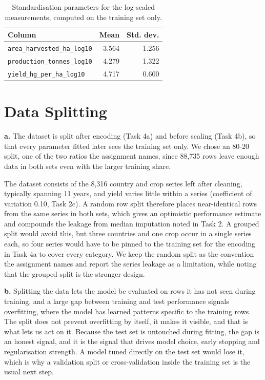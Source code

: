 \documentclass{article}
\begin{document}
\begin{table}[H]
    \centering
    \begin{tabular}{lrr}
        \toprule
        Column & Mean & Std. dev. \\
        \midrule
        \texttt{area\_harvested\_ha\_log10} & 3.564 & 1.256 \\
        \texttt{production\_tonnes\_log10} & 4.279 & 1.322 \\
        \texttt{yield\_hg\_per\_ha\_log10} & 4.717 & 0.600 \\
        \bottomrule
    \end{tabular}
    \caption{Standardisation parameters for the log-scaled measurements, computed on the training set only.}
    \label{tab:scaling}
\end{table}

\section{Data Splitting}

\textbf{a.}
The dataset is split after encoding (Task 4a) and before scaling (Task 4b), so that every parameter fitted later sees the training set only. We chose an 80-20 split, one of the two ratios the assignment names, since 88,735 rows leave enough data in both sets even with the larger training share.

The dataset consists of the 8,316 country and crop series left after cleaning, typically spanning 11 years, and yield varies little within a series (coefficient of variation 0.10, Task 2c). A random row split therefore places near-identical rows from the same series in both sets, which gives an optimistic performance estimate and compounds the leakage from median imputation noted in Task 2. A grouped split would avoid this, but three countries and one crop occur in a single series each, so four series would have to be pinned to the training set for the encoding in Task 4a to cover every category. We keep the random split as the convention the assignment names and report the series leakage as a limitation, while noting that the grouped split is the stronger design.

\textbf{b.}
Splitting the data lets the model be evaluated on rows it has not seen during training, and a large gap between training and test performance signals overfitting, where the model has learned patterns specific to the training rows. The split does not prevent overfitting by itself, it makes it visible, and that is what lets us act on it. Because the test set is untouched during fitting, the gap is an honest signal, and it is the signal that drives model choice, early stopping and regularisation strength. A model tuned directly on the test set would lose it, which is why a validation split or cross-validation inside the training set is the usual next step.
\end{document}
